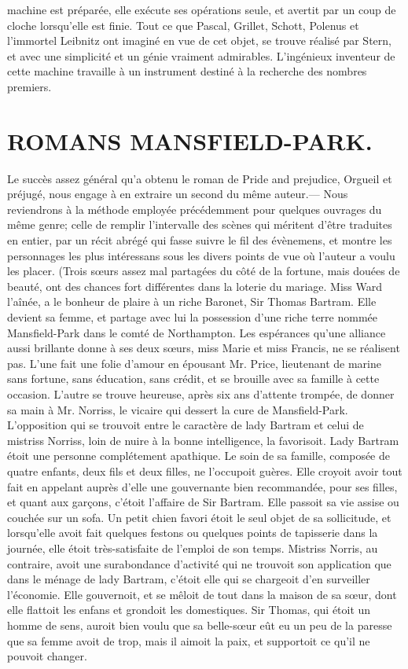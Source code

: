 \setcounter{page}{490} machine est préparée, elle exécute ses opérations seule, et avertit par un coup de cloche lorsqu'elle est finie. Tout ce que Pascal, Grillet, Schott, Polenus et l'immortel Leibnitz ont imaginé en vue de cet objet, se trouve réalisé par Stern, et avec une simplicité et un génie vraiment admirables. L'ingénieux inventeur de cette machine travaille à un instrument destiné à la recherche des nombres premiers.
\section{ROMANS \large{MANSFIELD-PARK.}}
Le succès assez général qu'a obtenu le roman de Pride and prejudice, Orgueil et préjugé, nous engage à en extraire un second du même auteur.— Nous reviendrons à la méthode employée précédemment pour quelques ouvrages du même genre; celle de remplir l'intervalle des scènes qui méritent d'être traduites en entier, par un récit abrégé qui fasse suivre le fil des évènemens, et montre les personnages les plus intéressans sous les divers points de vue où l'auteur a voulu les placer.\setcounter{page}{491} (Trois sœurs assez mal partagées du côté de la fortune, mais douées de beauté, ont des chances fort différentes dans la loterie du mariage. Miss Ward l’aînée, a le bonheur de plaire à un riche Baronet, Sir Thomas Bartram. Elle devient sa femme, et partage avec lui la possession d’une riche terre nommée Mansfield-Park dans le comté de Northampton. Les espérances qu’une alliance aussi brillante donne à ses deux sœurs, miss Marie et miss Francis, ne se réalisent pas. L’une fait une folie d’amour en épousant Mr. Price, lieutenant de marine sans fortune, sans éducation, sans crédit, et se brouille avec sa famille à cette occasion. L’autre se trouve heureuse, après six ans d’attente trompée, de donner sa main à Mr. Norriss, le vicaire qui dessert la cure de Mansfield-Park.
L’opposition qui se trouvoit entre le caractère de lady Bartram et celui de mistriss Norriss, loin de nuire à la bonne intelligence, la favorisoit. Lady Bartram étoit une personne complétement apathique. Le soin de sa famille, composée de quatre enfants, deux fils et deux filles, ne l’occupoit guères. Elle croyoit avoir tout fait en appelant auprès d’elle une gouvernante bien recommandée, pour ses filles, et quant aux garçons, c’étoit l’affaire de Sir Bartram. Elle passoit\setcounter{page}{492} sa vie assise ou couchée sur un sofa. Un petit chien favori étoit le seul objet de sa sollicitude, et lorsqu'elle avoit fait quelques festons ou quelques points de tapisserie dans la journée, elle étoit très-satisfaite de l'emploi de son temps. Mistriss Norris, au contraire, avoit une surabondance d'activité qui ne trouvoit son application que dans le ménage de lady Bartram, c'étoit elle qui se chargeoit d'en surveiller l'économie. Elle gouvernoit, et se mêloit de tout dans la maison de sa sœur, dont elle flattoit les enfans et grondoit les domestiques. Sir Thomas, qui étoit un homme de sens, auroit bien voulu que sa belle-sœur eût eu un peu de la paresse que sa femme avoit de trop, mais il aimoit la paix, et supportoit ce qu'il ne pouvoit changer.
